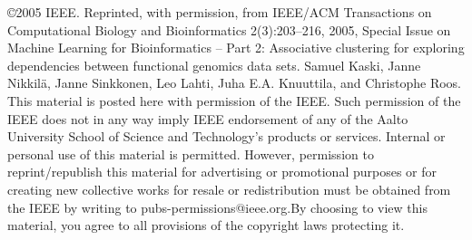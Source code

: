 \documentclass[12pt,onecolumn]{article}
\begin{document}
\noindent \copyright 2005 IEEE. Reprinted, with permission, from
IEEE/ACM Transactions on Computational Biology and Bioinformatics
2(3):203--216, 2005, Special Issue on Machine Learning for
Bioinformatics -- Part 2: Associative clustering for exploring
dependencies between functional genomics data sets.  Samuel Kaski,
Janne Nikkil{\"a}, Janne Sinkkonen, Leo Lahti, Juha E.A. Knuuttila,
and Christophe Roos.  This material is posted here with permission of
the IEEE. Such permission of the IEEE does not in any way imply IEEE
endorsement of any of the Aalto University School of Science and
Technology's products or services. Internal or personal use of this
material is permitted.  However, permission to reprint/republish this
material for advertising or promotional purposes or for creating new
collective works for resale or redistribution must be obtained from
the IEEE by writing to pubs-permissions@ieee.org.By choosing to view
this material, you agree to all provisions of the copyright laws
protecting it.
\end{document}
